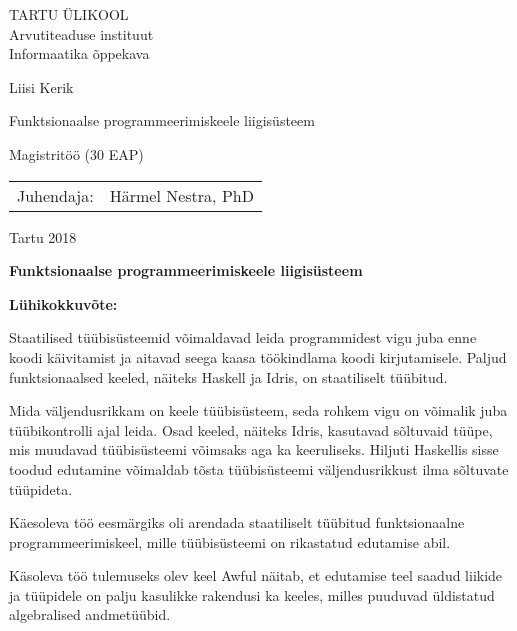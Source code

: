 \documentclass[12pt]{article}
\def\pealkiri{Funktsionaalse programmeerimiskeele liigisüsteem}
\begin{document}
  \thispagestyle{empty}
  \begin{center}
    \large
      TARTU ÜLIKOOL\\
      Arvutiteaduse instituut\\
      Informaatika õppekava

    \vspace{25mm}

    \Large
      Liisi Kerik

    \vspace{4mm}

    \huge
      \pealkiri

    \vspace{20mm}

    \Large
      Magistritöö (30 EAP)
  \end{center}

  \vspace{2mm}

  \begin{flushright}
    \begin{tabular}{rl} 
      Juhendaja: & Härmel Nestra, PhD
    \end{tabular}
  \end{flushright}
  \vfill
  \centerline{Tartu 2018}
  \newpage
  \noindent
  \textbf{\large\pealkiri}

  \vspace*{1ex}

  \noindent
  \textbf{Lühikokkuvõte:} 

  \noindent
  Staatilised tüübisüsteemid võimaldavad leida programmidest vigu juba enne koodi käivitamist ja aitavad seega kaasa töökindlama koodi kirjutamisele. Paljud funktsionaalsed keeled, näiteks Haskell ja Idris, on staatiliselt tüübitud.

  Mida väljendusrikkam on keele tüübisüsteem, seda rohkem vigu on võimalik juba tüübikontrolli ajal leida. Osad keeled, näiteks Idris, kasutavad sõltuvaid tüüpe, mis muudavad tüübisüsteemi võimsaks aga ka keeruliseks. Hiljuti Haskellis sisse toodud edutamine võimaldab tõsta tüübisüsteemi väljendusrikkust ilma sõltuvate tüüpideta.

  Käesoleva töö eesmärgiks oli arendada staatiliselt tüübitud funktsionaalne programmeerimiskeel, mille tüübisüsteemi on rikastatud edutamise abil.

  Käsoleva töö tulemuseks olev keel Awful näitab, et edutamise teel saadud liikide ja tüüpidele on palju kasulikke rakendusi ka keeles, milles puuduvad üldistatud algebralised andmetüübid.
\end{document}
